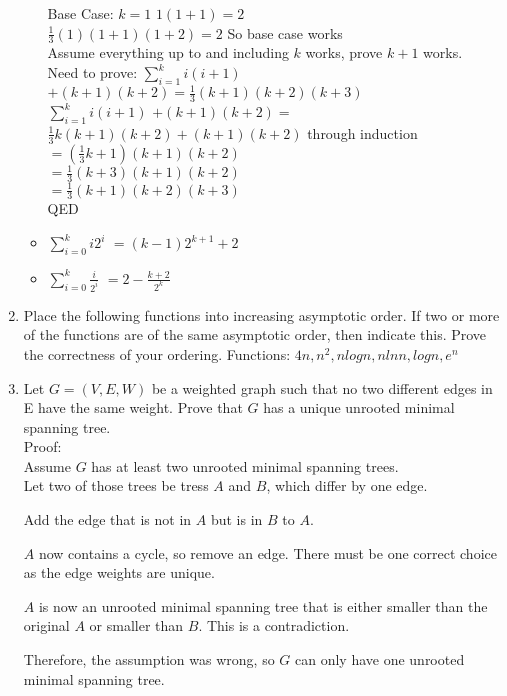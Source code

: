 \documentclass[12pt]{article}
\begin{document}
\begin{enumerate}
\begin{itemize}
Base Case: $k=1$
$1(1+1) = 2$\\
$\frac{1}{3}(1)(1+1)(1+2) = 2$ So base case works\\

Assume everything up to and including $k$ works, prove $k+1$ works.\\
Need to prove: $\displaystyle\sum\limits_{i=1}^k i(i+1)$ $+(k+1)(k+2) =
\frac{1}{3}(k+1)(k+2)(k+3)$\\
$\displaystyle\sum\limits_{i=1}^k i(i+1)$ $+(k+1)(k+2) =$\\
$\frac{1}{3}k(k+1)(k+2)+(k+1)(k+2)$ through induction\\
$= (\frac{1}{3}k+1)(k+1)(k+2)$\\
$= \frac{1}{3}(k+3)(k+1)(k+2)$\\
$= \frac{1}{3}(k+1)(k+2)(k+3)$\\
QED
\item $\displaystyle\sum\limits_{i=0}^k i2^i $ $= (k-1)2^{k+1}+2$
\item $\displaystyle\sum\limits_{i=0}^k \frac{i}{2^i} $ $= 2-\frac{k+2}{2^k}$
\end{itemize}


\item Place the following functions into increasing asymptotic order. If two
or more of the functions are of the same asymptotic order, then indicate this.
Prove the correctness of your ordering.
Functions: $4n, n^2, nlogn, nlnn, logn, e^n$

\item Let $G = (V,E,W)$ be a weighted graph such that no two different edges
in E have the same weight. Prove that $G$ has a unique unrooted minimal spanning
tree.\\
Proof:\\
Assume $G$ has at least two unrooted minimal spanning trees.\\
Let two of those trees be tress $A$ and $B$, which differ by one
edge.

Add the edge that is not in $A$ but is in $B$ to $A$.

$A$ now contains a cycle, so remove an edge. There must be one
correct choice as the edge weights are unique.

$A$ is now an unrooted minimal spanning tree that is either
smaller than the original $A$ or smaller than $B$. This is a contradiction.

Therefore, the assumption was wrong, so $G$ can only have one
unrooted minimal spanning tree.



\end{enumerate}
\end{document}
